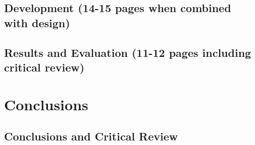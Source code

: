 \documentclass[11pt, a4paper]{article}
\begin{document}
\subsection {Development (14-15 pages when combined with design)}

\subsection {Results and Evaluation (11-12 pages including critical review)}

\section {Conclusions}

\subsection {Conclusions and Critical Review}

\printbibliography
\end{document}
